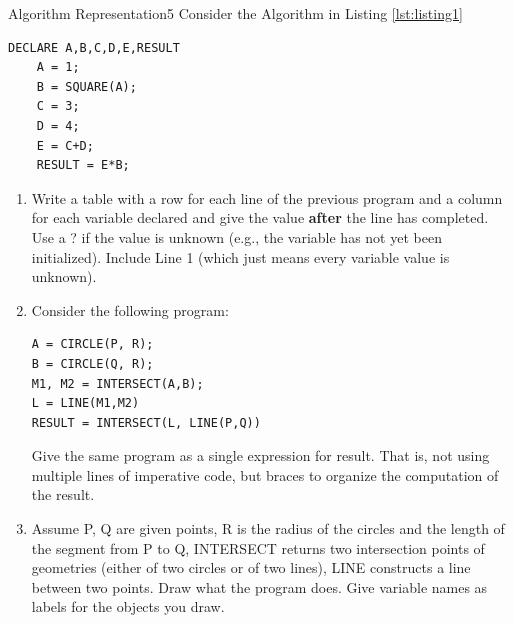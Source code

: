 \documentclass[twoside]{article}
\begin{document}
\begin{task}{Algorithm Representation}{5}{}
  Consider the Algorithm in Listing \ref{lst:listing1}
  \begin{lstlisting}[caption=An imperative program, label=lst:listing1]
    DECLARE A,B,C,D,E,RESULT
    A = 1;
    B = SQUARE(A);
    C = 3;
    D = 4;
    E = C+D;
    RESULT = E*B;
\end{lstlisting}

  \begin{enumerate}
  \item {Write a table with a row for each line of the previous program and a column for each variable declared and give the value \textbf{after} the line has completed. Use a ? if the value is unknown (e.g., the variable has not yet been initialized). Include Line 1 (which just means every variable value is unknown).
    \vspace*{8cm}}
    \clearpage
    
  \item{Consider the following program:
\begin{lstlisting}
A = CIRCLE(P, R);
B = CIRCLE(Q, R);
M1, M2 = INTERSECT(A,B);
L = LINE(M1,M2)
RESULT = INTERSECT(L, LINE(P,Q))
\end{lstlisting}


    Give the same program as a single expression for result. That is, not using multiple lines of imperative code, but braces to organize the computation of the result.
    \vspace*{4cm}}

  \item{Assume P, Q are given points, R is the radius of the circles and the length of the segment from P to Q, INTERSECT returns two intersection points of geometries (either of two circles or of two lines), LINE constructs a line between two points. Draw what the program does. Give variable names as labels for the objects you draw.\vspace*{2cm}}

    
  \end{enumerate}
  
  
\end{task}
\clearpage
\end{document}
